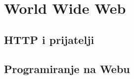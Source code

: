 
\section[World Wide Web]{World Wide Web}

\subsection{HTTP i prijatelji}

\subsection{Programiranje na Webu}

